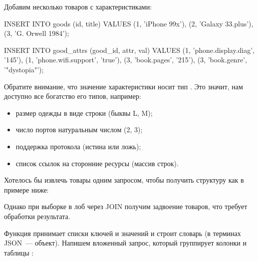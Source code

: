 Добавим несколько товаров с характеристиками:

\begin{english}
  \begin{sql}
INSERT INTO goods (id, title)
VALUES
  (1, 'iPhone 99x'),
  (2, 'Galaxy 33.plus'),
  (3, 'G. Orwell 1984');

INSERT INTO good_attrs (good_id, attr, val)
VALUES
  (1, 'phone.display.diag', '145'),
  (1, 'phone.wifi.support', 'true'),
  (3, 'book.pages', '215'),
  (3, 'book.genre', '"dystopia"');
  \end{sql}
\end{english}

Обратите внимание, что значение характеристики носит тип . Это значит, нам доступно все богатство его типов, например:

\begin{itemize}

\item
  размер одежды в виде строки (быквы L, M);

\item
  число портов натуральным числом (2, 3);

\item
  поддержка протокола (истина или ложь);

\item
  список ссылок на сторонние ресурсы (массив строк).

\end{itemize}

Хотелось бы извлечь товары одним запросом, чтобы получить структуру как в примере ниже:

\begin{english}
  \begin{clojure}
  \end{clojure}
\end{english}

Однако при выборке в лоб через JOIN получим задвоение товаров, что требует обработки результата.

Функция  принимает списки ключей и значений и строит словарь (в терминах JSON~--- объект). Напишем вложенный запрос, который группирует колонки  и  таблицы :

